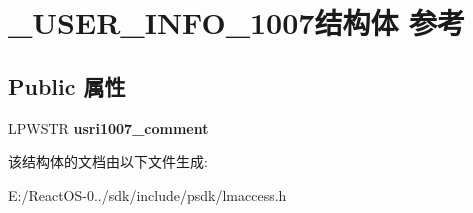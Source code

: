 \hypertarget{struct___u_s_e_r___i_n_f_o__1007}{}\section{\+\_\+\+U\+S\+E\+R\+\_\+\+I\+N\+F\+O\+\_\+1007结构体 参考}
\label{struct___u_s_e_r___i_n_f_o__1007}
\subsection*{Public 属性}
\begin{DoxyCompactItemize}
\item 
\mbox{\label{struct___u_s_e_r___i_n_f_o__1007_a1ef7873be210a05af4f801e405666990}} 
L\+P\+W\+S\+TR {\bfseries usri1007\+\_\+comment}
\end{DoxyCompactItemize}


该结构体的文档由以下文件生成\+:\begin{DoxyCompactItemize}
\item 
E\+:/\+React\+O\+S-\/0../sdk/include/psdk/lmaccess.\+h\end{DoxyCompactItemize}
